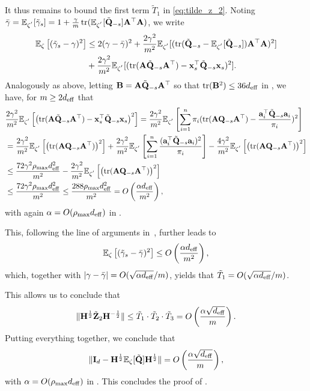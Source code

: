 \documentclass[11pt,a4paper]{article}
\begin{document}
It thus remains to bound the first term $\tilde T_1$ in \eqref{eq:tilde_z_2}. 
Noting $\bar\gamma={\mathbb{E}}_{\zeta^{'}}[\tilde \gamma_s] = 1+\frac{\gamma}{ m}\operatorname{tr}({\mathbb{E}}_{\zeta^{'}}[\tilde{\mathbf{Q}}_{-s}]\mathbf{A}^\top\mathbf{A})$, we write
\begin{align}
  {\mathbb{E}}_{\zeta} \left[(\tilde\gamma_s-\gamma)^2  \right] &\leq 2(\gamma-\bar\gamma)^2+\frac{2\gamma^2}{m^2}{\mathbb{E}}_{\zeta^{'}}[(\operatorname{tr}(\tilde{\mathbf{Q}}_{-s}-{\mathbb{E}}_{\zeta^{'}}[\tilde{\mathbf{Q}}_{-s}])\mathbf{A}^\top\mathbf{A})^2] \nonumber\\
  & +\frac{2\gamma^2}{m^2}{\mathbb{E}}_{\zeta^{'}}[(\operatorname{tr}(\mathbf{A}\tilde{\mathbf{Q}}_{-s}\mathbf{A}^\top)-\mathbf{x}_s^\top\tilde{\mathbf{Q}}_{-s}\mathbf{x}_s)^2].\nonumber
\end{align}
Analogously as above, letting $\mathbf{B}=\mathbf{A}\tilde{\mathbf{Q}}_{-s}\mathbf{A}^\top$ so that $\operatorname{tr}(\mathbf{B}^2)\leq 36 d_{\mathrm{eff}}$ in , we have, for $m\geq 2d_{\mathrm{eff}}$ that
\begin{align}
  &\frac{2\gamma^2}{m^2}{\mathbb{E}}_{\zeta^{'}}\left[\left(\operatorname{tr}(\mathbf{A}\tilde{\mathbf{Q}}_{-s}\mathbf{A}^\top)-\mathbf{x}_s^\top\tilde{\mathbf{Q}}_{-s}\mathbf{x}_s\right)^2\right]=  \frac{2\gamma^2}{m^2}{\mathbb{E}}_{\zeta^{'}}\left[\sum^n_{i=1}\pi_i(\operatorname{tr}(\mathbf{A}\mathbf{Q}_{-s}\mathbf{A}^\top)-\frac{\mathbf{a}_i^\top\tilde{\mathbf{Q}}_{-s}\mathbf{a}_i}{\pi_i})^2\right] \nonumber\\
  &= \frac{2\gamma^2}{m^2}{\mathbb{E}}_{\zeta^{'}}\left[\left(\operatorname{tr}(\mathbf{A}\mathbf{Q}_{-s}\mathbf{A}^\top)\right)^2\right]+ \frac{2\gamma^2}{m^2}{\mathbb{E}}_{\zeta^{'}}\left[\sum^n_{i=1}\frac{(\mathbf{a}_i^\top\tilde{\mathbf{Q}}_{-s}\mathbf{a}_i)^2}{\pi_i}\right]- \frac{4\gamma^2}{m^2}{\mathbb{E}}_{\zeta^{'}}\left[\left(\operatorname{tr}(\mathbf{A}\mathbf{Q}_{-s}\mathbf{A}^\top)\right)^2\right]\nonumber\\
  &\leq
  \frac{72\gamma^2\rho_{\max} d^2_{\mathrm{eff}}}{m^2}- \frac{2\gamma^2}{m^2}{\mathbb{E}}_{\zeta^{'}}\left[\left(\operatorname{tr}(\mathbf{A}\mathbf{Q}_{-s}\mathbf{A}^\top)\right)^2\right]\nonumber\\
  & \leq \frac{72\gamma^2\rho_{\max} d^2_{\mathrm{eff}}}{m^2}\leq \frac{288\rho_{\max} d^2_{\mathrm{eff}}}{m^2}= O \left( \frac{\alpha d_{\mathrm{eff}}}{m^2} \right), \nonumber
\end{align}
with again $\alpha=O(\rho_{\max} d_{\mathrm{eff}})$ in .

This, following the line of arguments in~\citet{derezinski2021newtonless}, further leads to
\begin{equation*}
 {\mathbb{E}}_{\zeta} \left[(\tilde\gamma_s-\bar\gamma)^2  \right]\leq O \left( \frac{\alpha d_{\mathrm{eff}}}{m^2} \right),
\end{equation*} 
which, together with $|\gamma-\bar\gamma|=O(\sqrt{\alpha d_{\mathrm{eff}}}/m)$, yields that $\tilde T_1=O(\sqrt{\alpha d_{\mathrm{eff}} }/m)$. 

This allows us to conclude that
\begin{equation*}
  \|\mathbf{H}^{\frac{1}{2}}\tilde{\mathbf{Z}}_2\mathbf{H}^{-\frac{1}{2}}\|\leq \tilde T_1\cdot\tilde T_2\cdot\tilde T_3=O \left(\frac{\alpha\sqrt{ d_{\mathrm{eff}}}}{m} \right).
\end{equation*}
Putting everything together, we conclude that
\begin{equation*}
  \|\mathbf{I}_d-\mathbf{H}^{\frac{1}{2}}{\mathbb{E}}_{\zeta} [\tilde{\mathbf{Q}}]\mathbf{H}^{\frac{1}{2}}\| = O \left(\frac{\alpha\sqrt{ d_{\mathrm{eff}}}}{m} \right),
\end{equation*}
with $ \alpha=O(\rho_{\max} d_{\mathrm{eff}})$ in .
This concludes the proof of .
\qedwhite
\end{document}
